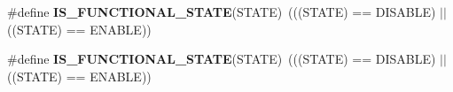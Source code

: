 \begin{DoxyCompactItemize}
\item 
\hypertarget{group___exported__types_gaffaf7c3f537d7a3370b1bbdda67a2bf6}{\#define {\bfseries I\-S\-\_\-\-F\-U\-N\-C\-T\-I\-O\-N\-A\-L\-\_\-\-S\-T\-A\-T\-E}(S\-T\-A\-T\-E)~(((S\-T\-A\-T\-E) == D\-I\-S\-A\-B\-L\-E) $\vert$$\vert$ ((S\-T\-A\-T\-E) == E\-N\-A\-B\-L\-E))}\label{group___exported__types_gaffaf7c3f537d7a3370b1bbdda67a2bf6}

\item 
\hypertarget{group___exported__types_gaffaf7c3f537d7a3370b1bbdda67a2bf6}{\#define {\bfseries I\-S\-\_\-\-F\-U\-N\-C\-T\-I\-O\-N\-A\-L\-\_\-\-S\-T\-A\-T\-E}(S\-T\-A\-T\-E)~(((S\-T\-A\-T\-E) == D\-I\-S\-A\-B\-L\-E) $\vert$$\vert$ ((S\-T\-A\-T\-E) == E\-N\-A\-B\-L\-E))}\label{group___exported__types_gaffaf7c3f537d7a3370b1bbdda67a2bf6}

\end{DoxyCompactItemize}
